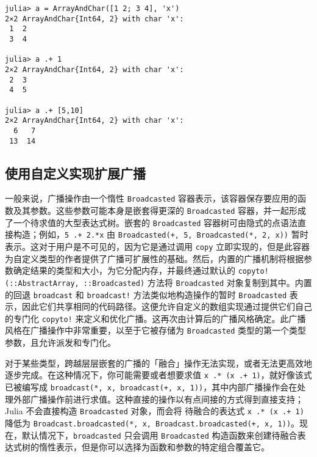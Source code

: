 \begin{verbatim}
julia> a = ArrayAndChar([1 2; 3 4], 'x')
2×2 ArrayAndChar{Int64, 2} with char 'x':
 1  2
 3  4

julia> a .+ 1
2×2 ArrayAndChar{Int64, 2} with char 'x':
 2  3
 4  5

julia> a .+ [5,10]
2×2 ArrayAndChar{Int64, 2} with char 'x':
  6   7
 13  14
\end{verbatim}



\hypertarget{5201970122303370123}{}


\subsection{使用自定义实现扩展广播}



一般来说，广播操作由一个惰性 \texttt{Broadcasted} 容器表示，该容器保存要应用的函数及其参数。这些参数可能本身是嵌套得更深的 \texttt{Broadcasted} 容器，并一起形成了一个待求值的大型表达式树。嵌套的 \texttt{Broadcasted} 容器树可由隐式的点语法直接构造；例如，\texttt{5 .+ 2.*x} 由 \texttt{Broadcasted(+, 5, Broadcasted(*, 2, x))} 暂时表示。这对于用户是不可见的，因为它是通过调用 \texttt{copy} 立即实现的，但是此容器为自定义类型的作者提供了广播可扩展性的基础。然后，内置的广播机制将根据参数确定结果的类型和大小，为它分配内存，并最终通过默认的 \texttt{copyto!(::AbstractArray, ::Broadcasted)} 方法将 \texttt{Broadcasted} 对象复制到其中。内置的回退 \texttt{broadcast} 和 \texttt{broadcast!} 方法类似地构造操作的暂时 \texttt{Broadcasted} 表示，因此它们共享相同的代码路径。这便允许自定义的数组实现通过提供它们自己的专门化 \texttt{copyto!} 来定义和优化广播。这再次由计算后的广播风格确定。此广播风格在广播操作中非常重要，以至于它被存储为 \texttt{Broadcasted} 类型的第一个类型参数，且允许派发和专门化。



对于某些类型，跨越层层嵌套的广播的「融合」操作无法实现，或者无法更高效地逐步完成。在这种情况下，你可能需要或者想要求值 \texttt{x .* (x .+ 1)}，就好像该式已被编写成 \texttt{broadcast(*, x, broadcast(+, x, 1))}，其中内部广播操作会在处理外部广播操作前进行求值。这种直接的操作以有点间接的方式得到直接支持；Julia 不会直接构造 \texttt{Broadcasted} 对象，而会将 待融合的表达式 \texttt{x .* (x .+ 1)} 降低为 \texttt{Broadcast.broadcasted(*, x, Broadcast.broadcasted(+, x, 1))}。现在，默认情况下，\texttt{broadcasted} 只会调用 \texttt{Broadcasted} 构造函数来创建待融合表达式树的惰性表示，但是你可以选择为函数和参数的特定组合覆盖它。




